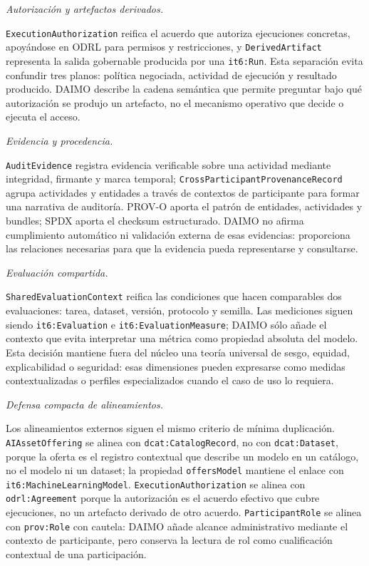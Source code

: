 \documentclass[Afour,sagev,times]{sagej}
\newcommand{\code}[1]{\texttt{#1}}
\begin{document}
\medskip\noindent\emph{Autorización y artefactos derivados.}\par\nobreak\noindent
\code{ExecutionAuthorization} reifica el acuerdo que autoriza ejecuciones concretas, apoyándose en ODRL para permisos y restricciones, y \code{DerivedArtifact} representa la salida gobernable producida por una \code{it6:Run}. Esta separación evita confundir tres planos: política negociada, actividad de ejecución y resultado producido. DAIMO describe la cadena semántica que permite preguntar bajo qué autorización se produjo un artefacto, no el mecanismo operativo que decide o ejecuta el acceso.

\medskip\noindent\emph{Evidencia y procedencia.}\par\nobreak\noindent
\code{AuditEvidence} registra evidencia verificable sobre una actividad mediante integridad, firmante y marca temporal; \code{CrossParticipantProvenanceRecord} agrupa actividades y entidades a través de contextos de participante para formar una narrativa de auditoría. PROV-O aporta el patrón de entidades, actividades y bundles; SPDX aporta el checksum estructurado. DAIMO no afirma cumplimiento automático ni validación externa de esas evidencias: proporciona las relaciones necesarias para que la evidencia pueda representarse y consultarse.

\medskip\noindent\emph{Evaluación compartida.}\par\nobreak\noindent
\code{SharedEvaluationContext} reifica las condiciones que hacen comparables dos evaluaciones: tarea, dataset, versión, protocolo y semilla. Las mediciones siguen siendo \code{it6:Evaluation} e \code{it6:EvaluationMeasure}; DAIMO sólo añade el contexto que evita interpretar una métrica como propiedad absoluta del modelo. Esta decisión mantiene fuera del núcleo una teoría universal de sesgo, equidad, explicabilidad o seguridad: esas dimensiones pueden expresarse como medidas contextualizadas o perfiles especializados cuando el caso de uso lo requiera.

\medskip\noindent\emph{Defensa compacta de alineamientos.}\label{sec:alignment-defense}\par\nobreak\noindent
Los alineamientos externos siguen el mismo criterio de mínima duplicación. \code{AIAssetOffering} se alinea con \code{dcat:CatalogRecord}, no con \code{dcat:Dataset}, porque la oferta es el registro contextual que describe un modelo en un catálogo, no el modelo ni un dataset; la propiedad \code{offersModel} mantiene el enlace con \code{it6:MachineLearningModel}. \code{ExecutionAuthorization} se alinea con \code{odrl:Agreement} porque la autorización es el acuerdo efectivo que cubre ejecuciones, no un artefacto derivado de otro acuerdo. \code{ParticipantRole} se alinea con \code{prov:Role} con cautela: DAIMO añade alcance administrativo mediante el contexto de participante, pero conserva la lectura de rol como cualificación contextual de una participación.
\end{document}
